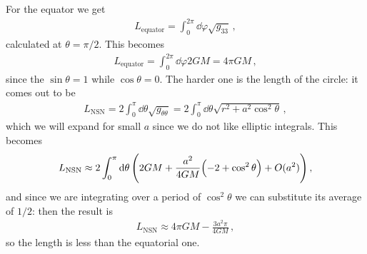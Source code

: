 \documentclass[main.tex]{subfiles}
\begin{document}
For the equator we get 
%
\begin{align}
  L _{\text{equator}} = \int_{0}^{2 \pi } \dd{\varphi } \sqrt{g_{33}}
\,,
\end{align}
%
calculated at \(\theta = \pi /2\). This becomes 
%
\begin{align}
  L _{\text{equator}} = \int_{0}^{2 \pi } \dd{\varphi } 2GM = 4 \pi GM
\,,
\end{align}
%
since the \(\sin \theta = 1\) while \(\cos \theta = 0\). The harder one is the length of the circle: it comes out to be 
%
\begin{align}
  L _{\text{NSN}} = 2 \int_{0}^{\pi }  \dd{\theta } \sqrt{g_{\theta \theta }}
  = 2 \int_{0}^{\pi } \dd{\theta } \sqrt{r^2 + a^2 \cos^2\theta }
\,,
\end{align}
%
which we will expand for small \(a\) since we do not like elliptic integrals. This becomes 
%
\begin{align}
  L _{\text{NSN}} \approx 2 \int_{0}^{\pi } \dd{\theta } \qty(2GM + \frac{a^2}{4GM} \qty(-2 + \cos^2 \theta )  + O(a^2))
\,,
\end{align}
%
and since we are integrating over a period of \(\cos^2\theta\) we can substitute its average of \(1/2\): then the result is 
%
\begin{align}
L _{\text{NSN}} \approx 4\pi GM - \frac{3a^2 \pi }{4GM}
\,,
\end{align}
%
so the length is less than the equatorial one. 
\end{document}
